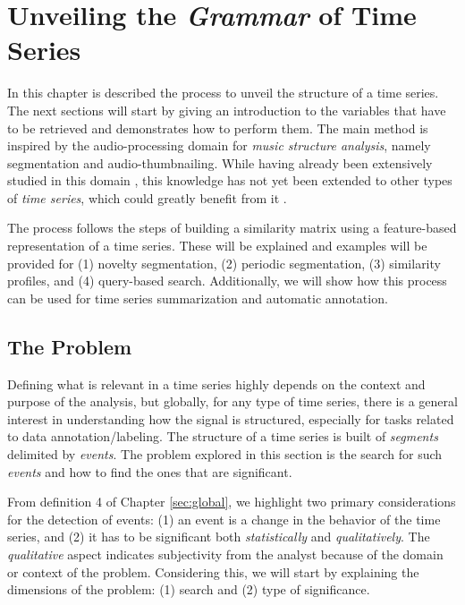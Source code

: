 
%

\chapter{Unveiling the \textit{Grammar} of Time Series}
\label{cha:segmentation}

In this chapter is described the process to unveil the structure of a time series. The next sections will start by giving an introduction to the variables that have to be retrieved and demonstrates how to perform them. The main method is inspired by the audio-processing domain for \textit{music structure analysis}, namely segmentation and audio-thumbnailing. While having already been extensively studied in this domain \cite{fmp1, audiolabs1, audiolabs2, cpd_audio}, this knowledge has not yet been extended to other types of \textit{time series}, which could greatly benefit from it \cite{muller_music_health}. 
\par
The process follows the steps of building a similarity matrix using a feature-based representation of a time series. These will be explained and examples will be provided for (1) novelty segmentation, (2) periodic segmentation, (3) similarity profiles, and (4) query-based search. Additionally, we will show how this process can be used for time series summarization and automatic annotation.

\section{The Problem}

Defining what is relevant in a time series highly depends on the context and purpose of the analysis, but globally, for any type of time series, there is a general interest in understanding how the signal is structured, especially for tasks related to data annotation/labeling. The structure of a time series is built of \textit{segments} delimited by \textit{events}. The problem explored in this section is the search for such \textit{events} and how to find the ones that are significant. 
\par
From definition 4 of Chapter \ref{sec:global}, we highlight two primary considerations for the detection of events: (1) an event is a change in the behavior of the time series, and (2) it has to be significant both \textit{statistically} and \textit{qualitatively}. The \textit{qualitative} aspect indicates subjectivity from the analyst because of the domain or context of the problem. Considering this, we will start by explaining the dimensions of the problem: (1) search and (2) type of significance. 

